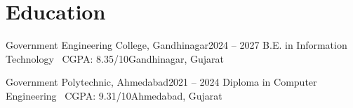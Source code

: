 \section{Education}

\resumeSubHeadingListStart

\resumeSubheading
{Government Engineering College, Gandhinagar}{2024 -- 2027}
{B.E. in Information Technology \textbar\ CGPA: 8.35/10}{Gandhinagar, Gujarat}

\resumeSubheading
{Government Polytechnic, Ahmedabad}{2021 -- 2024}
{Diploma in Computer Engineering \textbar\ CGPA: 9.31/10}{Ahmedabad, Gujarat}

\resumeSubHeadingListEnd
